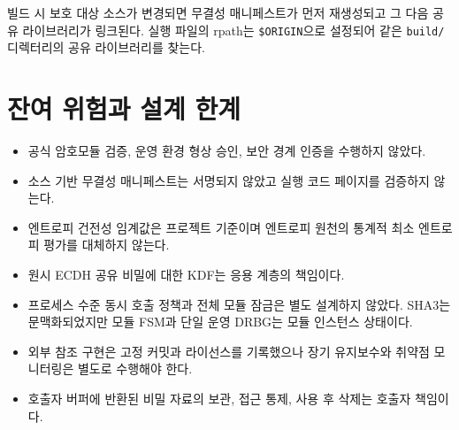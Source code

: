 \documentclass[11pt,a4paper]{article}
\begin{document}
빌드 시 보호 대상 소스가 변경되면 무결성 매니페스트가 먼저 재생성되고 그
다음 공유 라이브러리가 링크된다. 실행 파일의 rpath는 \texttt{\$ORIGIN}으로
설정되어 같은 \texttt{build/} 디렉터리의 공유 라이브러리를 찾는다.

\section{잔여 위험과 설계 한계}

\begin{itemize}
  \item 공식 암호모듈 검증, 운영 환경 형상 승인, 보안 경계 인증을 수행하지 않았다.
  \item 소스 기반 무결성 매니페스트는 서명되지 않았고 실행 코드 페이지를 검증하지 않는다.
  \item 엔트로피 건전성 임계값은 프로젝트 기준이며 엔트로피 원천의 통계적
        최소 엔트로피 평가를 대체하지 않는다.
  \item 원시 ECDH 공유 비밀에 대한 KDF는 응용 계층의 책임이다.
  \item 프로세스 수준 동시 호출 정책과 전체 모듈 잠금은 별도 설계하지 않았다.
        SHA3는 문맥화되었지만 모듈 FSM과 단일 운영 DRBG는 모듈 인스턴스 상태이다.
  \item 외부 참조 구현은 고정 커밋과 라이선스를 기록했으나 장기 유지보수와
        취약점 모니터링은 별도로 수행해야 한다.
  \item 호출자 버퍼에 반환된 비밀 자료의 보관, 접근 통제, 사용 후 삭제는 호출자 책임이다.
\end{itemize}
\end{document}
